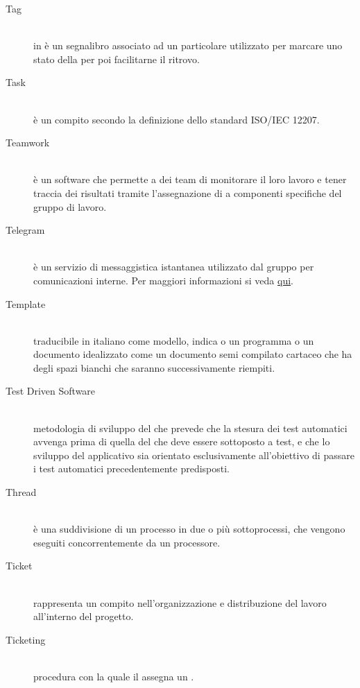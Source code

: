 \documentclass[12pt,a4paper]{article}
\begin{document}
\begin{description}
\item[Tag] 
\hfill\\in {} è un segnalibro associato ad un particolare  utilizzato per marcare uno stato della  per poi facilitarne il ritrovo.

\item[Task] 
\hfill\\è un compito secondo la definizione dello standard ISO/IEC 12207.

\item[Teamwork] 
\hfill\\è un software che permette a dei team di monitorare il loro lavoro e tener traccia dei risultati tramite l'assegnazione di  a componenti specifiche del gruppo di lavoro.

\item[Telegram] 
\hfill\\è un servizio di messaggistica istantanea utilizzato dal gruppo per comunicazioni interne. Per maggiori informazioni si veda \href{https://it.wikipedia.org/wiki/Telegram_(software)}{qui}.

\item[Template] 
\hfill\\traducibile in italiano come modello, indica o un programma o un documento idealizzato come un documento semi compilato cartaceo che ha degli spazi bianchi che saranno successivamente riempiti.


\item[Test Driven Software] 
\hfill\\ metodologia di sviluppo del  che prevede che la stesura dei test automatici avvenga prima di quella del  che deve essere sottoposto a  test, e che lo sviluppo del  applicativo sia orientato esclusivamente all'obiettivo di passare i test automatici precedentemente predisposti.

\item[Thread] 
\hfill\\è una suddivisione di un processo in due o più sottoprocessi, che vengono eseguiti concorrentemente da un processore.

\item[Ticket] 
\hfill\\rappresenta un compito nell'organizzazione e distribuzione del lavoro all'interno del progetto.

\item[Ticketing] 
\hfill\\procedura con la quale il \RE assegna un .


\end{description}
\end{document}
